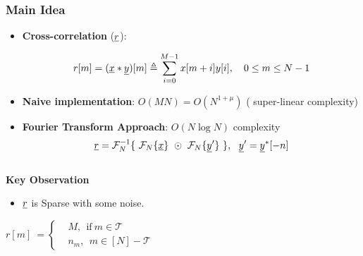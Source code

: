 	
\begin{frame}\frametitle{Main Idea}
	\vspace{-0.4cm}
			\begin{block}{}
			
				\begin{itemize}
					\item {\bf Cross-correlation} ($\underline{r}$):
					
					\begin{equation}\label{eqn:Rxy_def} \nonumber
					r[m]=(\underline{x}*\underline{y})[m] \triangleq \sum_{i=0}^{M-1} x[m+i] y[i], ~ ~ \ 0 \leq m \leq N-1
					\end{equation}
					\item {\bf Naive implementation}: $O(MN) = O(N^{1+\mu})$ ({\color{blue} super-linear} complexity)
					\item 	{\bf Fourier Transform Approach}: $O(N \log N)$ complexity
					\begin{equation}\nonumber
					\rv = \mathcal{F}_{N}^{-1} \{~  \mathcal{F}_{N}\{\xv\} ~ \odot ~  \mathcal{F}_{N}\{\yv'\} ~ \}, \ \ \yv' = \yv^{*}[-n]
					\end{equation}
					
				\end{itemize}
			\end{block}
			
				\begin{columns}
					\column{0.45\columnwidth}
			\begin{block}{\alert{ \bf Key Observation}}
			\vspace{0.2cm}
				\begin{itemize}
					\item $\underline{r}$ is {\color{blue}Sparse} with some noise.
				\end{itemize}
				 \begin{equation} \label{eqn:RXY_sparse}\nonumber
				 r[m] \ = \left\{
				 \begin{array}{ll}
				 &M,~~  \text{if} \ m \in \mathcal{T} \\
				 & n_m,~~ m \in [N]-\mathcal{T}
				 \end{array}
				 \right.  			
				 \end{equation}
			\end{block}
						
					\begin{figure}
						\centering
						\scalebox{0.35}{}
					\end{figure}
					
				\end{columns}
				
					
\end{frame}

